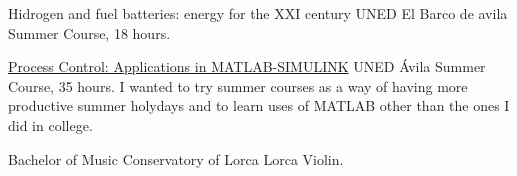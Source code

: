 \documentclass[11pt,a4paper,roman]{moderncv}
\begin{document}
	{Hidrogen and fuel batteries: energy for the XXI century}
	{UNED}
	{El Barco de avila}
	{}
	{Summer Course, 18 hours.}

					{\href{http://portal.uned.es/portal/page?_pageid=93,22547880&_dad=portal&_schema=PORTAL&idCurso=042}		{Process Control: Applications in MATLAB-SIMULINK}}
	{UNED}
	{\'Avila}
	{}
	{Summer Course, 35 hours. I wanted to try summer courses as a way of having more 
	productive summer holydays and to learn uses of MATLAB other than the ones I did 
	in college.}

	{Bachelor of Music}
	{Conservatory of Lorca}
	{Lorca}
	{}
	{Violin.}


\end{document}
